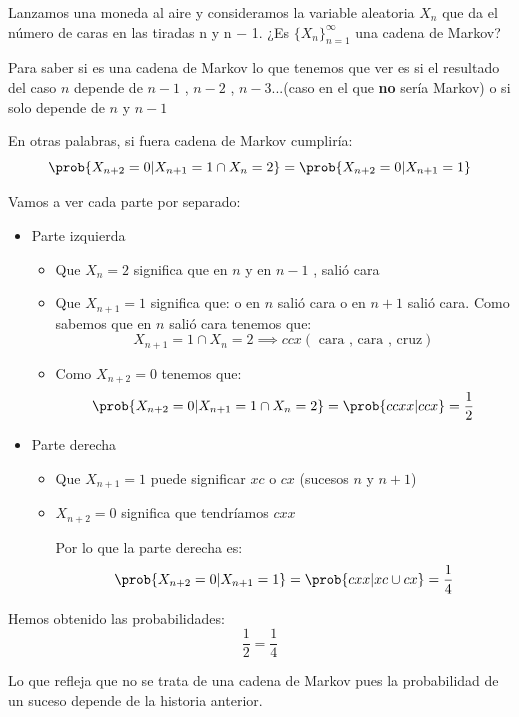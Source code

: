 \begin{problem}[3]
	Lanzamos una moneda al aire y consideramos la variable aleatoria $X_n$ que da el número
	de caras en las tiradas n y n − 1. ¿Es $\{X_n\}^{\infty}_{n=1}$ una cadena de Markov?
	\solution

	Para saber si es una cadena de Markov lo que tenemos que ver es si el resultado del caso $n$ depende de $n-1$ , $n-2$ , $n-3$...(caso en el que \textbf{no} sería Markov) o si solo depende de $n$ y $n-1$

	En otras palabras, si fuera cadena de Markov cumpliría:
	$$\prob{X_{n+2} = 0| X_{n+1} = 1 \cap X_n = 2} = \prob{X_{n+2} = 0 | X_{n+1} = 1}$$

	Vamos a ver cada parte por separado:
	\begin{itemize}
		\item Parte izquierda
		\begin{itemize}
			\item Que $X_n = 2$ significa que en $n$ y en $n-1$ , salió cara
			\item Que $X_{n+1} = 1$ significa que: o en $n$ salió cara o en $n+1$ salió cara. Como sabemos que en $n$ salió cara tenemos que:
			$$ X_{n+1} = 1 \cap X_n = 2 \implies ccx(\text{ cara , cara , cruz})$$
			\item Como $X_{n+2} = 0$ tenemos que:
			$$\prob{X_{n+2} = 0| X_{n+1} = 1 \cap X_n = 2} = \prob{ccxx| ccx} = \frac{1}{2}$$
		\end{itemize}
		\item Parte derecha
		\begin{itemize}
			\item Que $X_{n+1} = 1$ puede significar $xc$ o $cx$ (sucesos $n$ y $n+1$)
			\item $X_{n+2} = 0$ significa que tendríamos $cxx$


			Por lo que la parte derecha es:
			$$\prob{X_{n+2} = 0 | X_{n+1} = 1} = \prob{cxx| xc \cup cx} = \frac{1}{4}$$
		\end{itemize}

	\end{itemize}

	Hemos obtenido las probabilidades:
	 $$ \frac{1}{2} = \frac{1}{4}$$

	Lo que refleja que no se trata de una cadena de Markov pues la probabilidad de un suceso depende de la historia anterior.

\end{problem}

